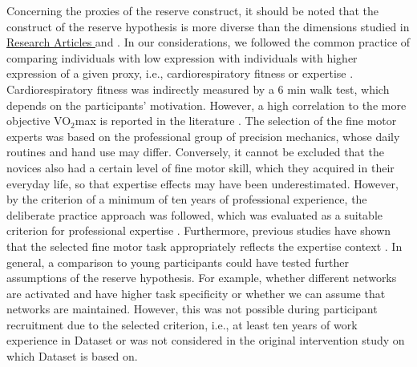 Concerning the proxies of the reserve construct, it should be noted that the construct of the reserve hypothesis is more diverse than the dimensions studied in \hyperref[results:paperI]{Research Articles } and \hyperref[results:paperI]{}. In our considerations, we followed the common practice of comparing individuals with low expression with individuals with higher expression of a given proxy, i.e., cardiorespiratory fitness or expertise \cite{Koen2019}. Cardiorespiratory fitness was indirectly measured by a 6 min walk test, which depends on the participants' motivation. However, a high correlation to the more objective VO$_2$max is reported in the literature \cite{Zhang2017}. The selection of the fine motor experts was based on the professional group of precision mechanics, whose daily routines and hand use may differ. Conversely, it cannot be excluded that the novices also had a certain level of fine motor skill, which they acquired in their everyday life, so that expertise effects may have been underestimated. However, by the criterion of a minimum of ten years of professional experience, the deliberate practice approach was followed, which was evaluated as a suitable criterion for professional expertise \cite{Ericsson1991, Voelcker-Rehage2013}. Furthermore, previous studies have shown that the selected fine motor task appropriately reflects the expertise context \cite{Vieluf2018, Goelz2018, Vieluf2012, Vieluf2013}. In general, a comparison to young participants could have tested further assumptions of the reserve hypothesis. For example, whether different networks are activated and have higher task specificity or whether we can assume that networks are maintained. However, this was not possible during participant recruitment due to the selected criterion, i.e., at least ten years of work experience in Dataset  or was not considered in the original intervention study on which Dataset  is based on.\\
